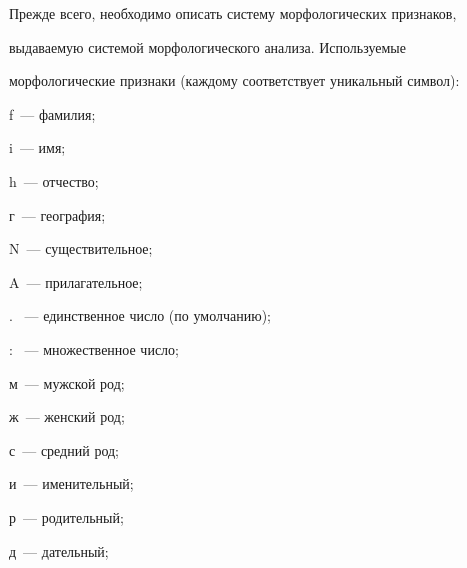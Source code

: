    


   \vspace*{-1pt}


   


   Прежде всего, необходимо описать систему морфологических признаков, 


выдаваемую системой морфологического анализа. Используемые 


морфологические признаки (каждому соответствует уникальный символ):


   


f~--- фамилия;





i~--- имя;





h~--- отчество;





г~--- география;





N~--- существительное;





A~--- прилагательное;





. ~--- единственное число (по умолчанию);





: ~--- множественное число;





м~--- мужской род;





ж~--- женский род;





с~--- средний род;





и~--- именительный;





р~--- родительный;





д~--- дательный;





